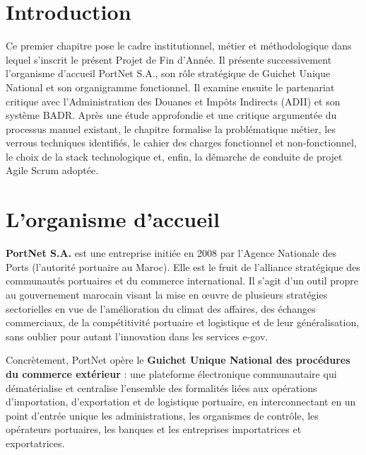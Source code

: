 
\section*{Introduction}

Ce premier chapitre pose le cadre institutionnel, m\'{e}tier et m\'{e}thodologique dans lequel s'inscrit le pr\'{e}sent Projet de Fin d'Ann\'{e}e. Il pr\'{e}sente successivement l'organisme d'accueil PortNet S.A., son r\^{o}le strat\'{e}gique de Guichet Unique National et son organigramme fonctionnel. Il examine ensuite le partenariat critique avec l'Administration des Douanes et Imp\^{o}ts Indirects (ADII) et son syst\`{e}me BADR. Apr\`{e}s une \'{e}tude approfondie et une critique argument\'{e}e du processus manuel existant, le chapitre formalise la probl\'{e}matique m\'{e}tier, les verrous techniques identifi\'{e}s, le cahier des charges fonctionnel et non-fonctionnel, le choix de la stack technologique et, enfin, la d\'{e}marche de conduite de projet Agile Scrum adopt\'{e}e.

\section{L'organisme d'accueil}

\textbf{PortNet S.A.} est une entreprise initiée en 2008 par l'Agence Nationale
des Ports (l'autorité portuaire au Maroc). Elle est le fruit de l'alliance
stratégique des communautés portuaires et du commerce international. Il s'agit
d'un outil propre au gouvernement marocain visant la mise en \oe uvre de
plusieurs stratégies sectorielles en vue de l'amélioration du climat des
affaires, des échanges commerciaux, de la compétitivité portuaire et logistique
et de leur généralisation, sans oublier pour autant l'innovation dans les
services e-gov.

Concrètement, PortNet opère le \textbf{Guichet Unique National des procédures du
commerce extérieur} : une plateforme électronique communautaire qui dématérialise
et centralise l'ensemble des formalités liées aux opérations d'importation,
d'exportation et de logistique portuaire, en interconnectant en un point d'entrée
unique les administrations, les organismes de contrôle, les opérateurs
portuaires, les banques et les entreprises importatrices et exportatrices.


